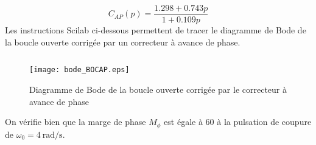 \[
C_{AP}(p)=\dfrac{1.298 + 0.743p } {1 + 0.109p}
\]
Les instructions Scilab ci-dessous permettent de tracer le diagramme 
de Bode de la boucle ouverte corrigée par un correcteur à avance de phase.
\inputminted{scilab}{codes/scilab/code_q8_chap_correction.sce}
\begin{figure}
    \centering
    \texttt{[image: bode\_BOCAP.eps]}
    \caption{Diagramme de Bode de la boucle ouverte corrigée par le correcteur
    à avance de phase}
\end{figure}
On vérifie bien que la marge de phase $M_\phi$ est égale à \SI{60}{\degreeSI}
à la pulsation de coupure de $\omega_0=\SI{4}{\radian\per\second}$.
